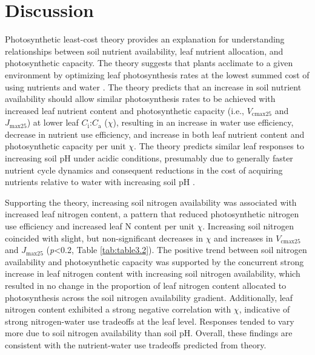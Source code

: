 \section{Discussion}
\noindent Photosynthetic least-cost theory provides an explanation for understanding relationships between soil nutrient availability, leaf nutrient allocation, and photosynthetic capacity. The theory suggests that plants acclimate to a given environment by optimizing leaf photosynthesis rates at the lowest summed cost of using nutrients and water . The theory predicts that an increase in soil nutrient availability should allow similar photosynthesis rates to be achieved with increased leaf nutrient content and photosynthetic capacity (i.e., $V_\mathrm{cmax25}$ and $J_\mathrm{max25}$) at lower leaf $C_\mathrm{i}$:$C_\mathrm{a}$ ($\chi$), resulting in an increase in water use efficiency, decrease in nutrient use efficiency, and increase in both leaf nutrient content and photosynthetic capacity per unit $\chi$. The theory predicts similar leaf responses to increasing soil pH under acidic conditions, presumably due to generally faster nutrient cycle dynamics and consequent reductions in the cost of acquiring nutrients relative to water with increasing soil pH .
    
Supporting the theory, increasing soil nitrogen availability was associated with increased leaf nitrogen content, a pattern that reduced photosynthetic nitrogen use efficiency and increased leaf N content per unit $\chi$. Increasing soil nitrogen coincided with slight, but non-significant decreases in $\chi$ and increases in $V_\mathrm{cmax25}$ and $J_\mathrm{max25}$ (\textit{p}<0.2, Table \ref{tab:table3.2}). The positive trend between soil nitrogen availability and photosynthetic capacity was supported by the concurrent strong increase in leaf nitrogen content with increasing soil nitrogen availability, which resulted in no change in the proportion of leaf nitrogen content allocated to photosynthesis across the soil nitrogen availability gradient. Additionally, leaf nitrogen content exhibited a strong negative correlation with $\chi$, indicative of strong nitrogen-water use tradeoffs at the leaf level. Responses tended to vary more due to soil nitrogen availability than soil pH. Overall, these findings are consistent with the nutrient-water use tradeoffs predicted from theory.

